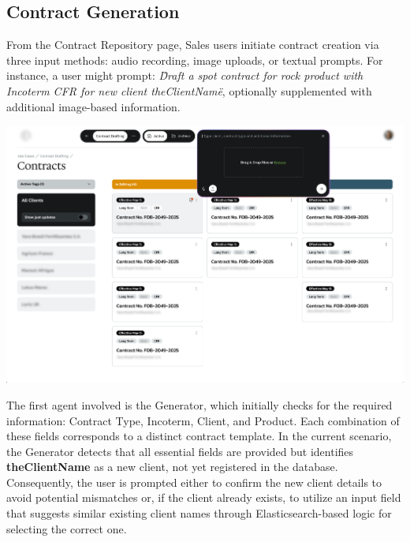 \subsection{Contract Generation}
From the Contract Repository page, Sales users initiate contract creation via three input methods: audio recording, image uploads, or textual prompts. For instance, a user might prompt: \textit{\"Draft a spot contract for rock product with Incoterm CFR for new client theClientName\"}, optionally supplemented with additional image-based information.

\begin{center}
    \centering
    \includegraphics[width=1\textwidth]{Images/Generate Contract Component.png}
    \label{fig:contract_creation_component}
\end{center}

The first agent involved is the Generator, which initially checks for the required information: Contract Type, Incoterm, Client, and Product. Each combination of these fields corresponds to a distinct contract template. In the current scenario, the Generator detects that all essential fields are provided but identifies \textbf{theClientName} as a new client, not yet registered in the database. Consequently, the user is prompted either to confirm the new client details to avoid potential mismatches or, if the client already exists, to utilize an input field that suggests similar existing client names through Elasticsearch-based logic for selecting the correct one.

